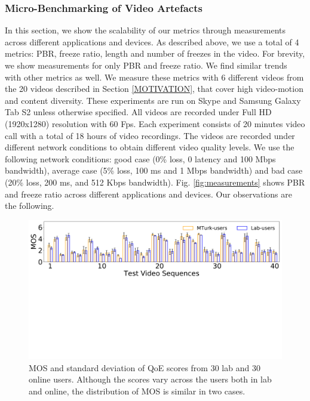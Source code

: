 \subsubsection{Micro-Benchmarking of Video Artefacts}
In this section, we show the scalability of our metrics through measurements across different applications and devices. As described above, we use a total of 4 metrics: PBR, freeze ratio, length and number of freezes in the video. For brevity, we show measurements for only PBR and freeze ratio. We find similar trends with other metrics as well. We measure these metrics with 6 different videos from the 20 videos described in Section \ref{MOTIVATION}, that cover high video-motion and content diversity. These experiments are run on Skype and Samsung Galaxy Tab S2 unless otherwise specified. All videos are recorded under Full HD (1920x1280) resolution with 60 Fps. Each experiment consists of 20 minutes video call with a total of 18 hours of video recordings. The videos are recorded under different network conditions to obtain different video quality  levels. We use the following network conditions: good case (0\% loss, 0 latency and 100 Mbps bandwidth), average case (5\% loss, 100 ms and 1 Mbps bandwidth) and bad case (20\% loss, 200 ms, and 512 Kbps bandwidth). Fig. \ref{fig:measurements} shows PBR and freeze ratio across different applications and devices. Our observations are the following.

\begin{figure}[t]
  \centering
  \includegraphics[width=\textwidth]{sections/network-work/mos}
  \vspace{-2.3in}
  \caption{MOS and standard deviation of QoE scores from 30 lab and 30 online users. Although the scores vary across the users both in lab and online, the distribution of MOS is similar in two cases.}
  \vspace{-0.12in}
  \label{fig:mos}
\end{figure}

